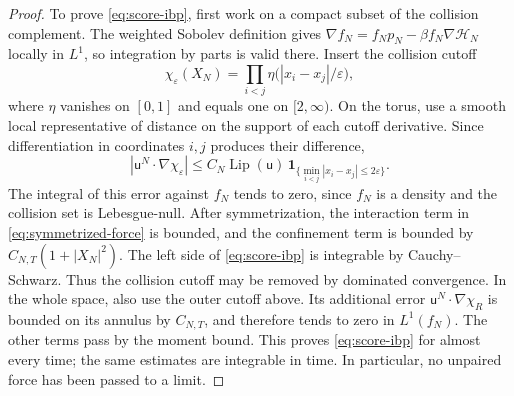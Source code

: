 \documentclass[11pt,reqno]{amsart}
\numberwithin{equation}{section}
\theoremstyle{definition}
\theoremstyle{remark}
\newcommand{\HN}{\mathcal H_N}
\renewcommand{\u}{\mathsf u}
\newcommand{\Lip}{\operatorname{Lip}}
\begin{document}
\begin{proof}
To prove \eqref{eq:score-ibp}, first work on a compact subset of the collision complement. The weighted Sobolev definition gives $\nabla f_N=f_Np_N-\beta f_N\nabla \HN$ locally in $L^1$, so integration by parts is valid there. Insert the collision cutoff
\begin{equation}\label{eq:collision-cutoff}
 \chi_\varepsilon(X_N)=\prod_{i<j}\eta\bigl(|x_i-x_j|/\varepsilon\bigr),
\end{equation}
where $\eta$ vanishes on $[0,1]$ and equals one on $[2,\infty)$. On the torus, use a smooth local representative of distance on the support of each cutoff derivative. Since differentiation in coordinates $i,j$ produces their difference,
\begin{equation}\label{eq:collision-error}
 |\u^N\cdot\nabla\chi_\varepsilon|
 \leq C_N\Lip(\u)\,\boldsymbol 1_{\{\min_{i<j}|x_i-x_j|\leq2\varepsilon\}}.
\end{equation}
The integral of this error against $f_N$ tends to zero, since $f_N$ is a density and the collision set is Lebesgue-null. After symmetrization, the interaction term in \eqref{eq:symmetrized-force} is bounded, and the confinement term is bounded by $C_{N,T}(1+|X_N|^2)$. The left side of \eqref{eq:score-ibp} is integrable by Cauchy--Schwarz. Thus the collision cutoff may be removed by dominated convergence. In the whole space, also use the outer cutoff above. Its additional error $\u^N\cdot\nabla\chi_R$ is bounded on its annulus by $C_{N,T}$, and therefore tends to zero in $L^1(f_N)$. The other terms pass by the moment bound. This proves \eqref{eq:score-ibp} for almost every time; the same estimates are integrable in time. In particular, no unpaired force has been passed to a limit.


\end{proof}
\end{document}
